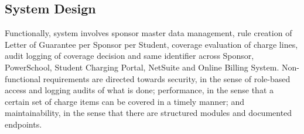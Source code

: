     \subsection{System Design}
    
    Functionally, system involves sponsor master data management, rule creation of Letter of Guarantee per Sponsor per Student, coverage evaluation of charge lines, audit logging of coverage decision and same identifier across Sponsor, PowerSchool, Student Charging Portal, NetSuite and Online Billing System. Non-functional requirements are directed towards security, in the sense of role-based access and logging audits of what is done; performance, in the sense that a certain set of charge items can be covered in a timely manner; and maintainability, in the sense that there are structured modules and documented endpoints.
    
